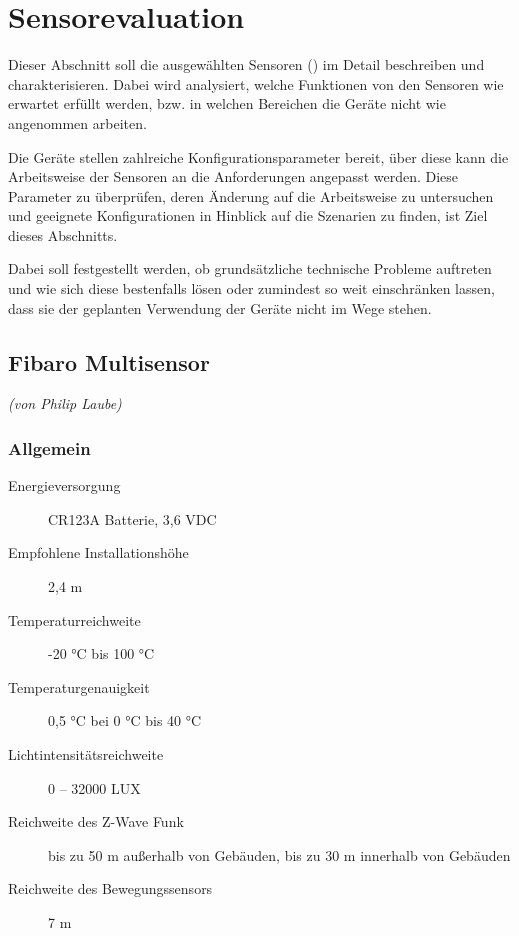 \newpage
\section{Sensorevaluation}
Dieser Abschnitt soll die ausgewählten Sensoren () im Detail beschreiben und charakterisieren. Dabei wird analysiert, welche Funktionen von den Sensoren wie erwartet erfüllt werden, bzw. in welchen Bereichen die Geräte nicht wie angenommen arbeiten.

Die Geräte stellen zahlreiche Konfigurationsparameter bereit, über diese kann die Arbeitsweise der Sensoren an die Anforderungen angepasst werden. Diese Parameter zu überprüfen, deren Änderung auf die Arbeitsweise zu untersuchen und geeignete Konfigurationen in Hinblick auf die Szenarien zu finden, ist Ziel dieses Abschnitts.

Dabei soll festgestellt werden, ob grundsätzliche technische Probleme auftreten und wie sich diese bestenfalls lösen oder zumindest so weit einschränken lassen, dass sie der geplanten Verwendung der Geräte nicht im Wege stehen.


\newpage
\subsection{Fibaro Multisensor}
\emph{(von Philip Laube)}

\subsubsection{Allgemein}

\begin{description}
	\item[Energieversorgung] CR123A Batterie, 3,6 VDC
	\item[Empfohlene Installationshöhe] 2,4 m
	\item[Temperaturreichweite] -20 °C bis 100 °C
	\item[Temperaturgenauigkeit] 0,5 °C bei 0 °C bis 40 °C
	\item[Lichtintensitätsreichweite] 0 – 32000 LUX
	\item[Reichweite des Z-Wave Funk] bis zu 50 m außerhalb von Gebäuden, bis zu 30 m innerhalb von Gebäuden
	\item[Reichweite des Bewegungssensors] 7 m
\end{description}

